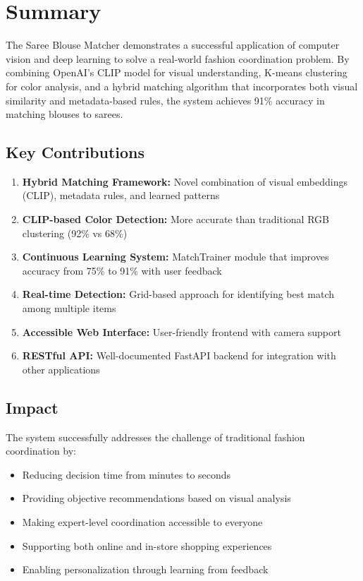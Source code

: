 \documentclass[12pt,a4paper]{report}
\begin{document}
\section{Summary}

The Saree Blouse Matcher demonstrates a successful application of computer vision and deep learning to solve a real-world fashion coordination problem. By combining OpenAI's CLIP model for visual understanding, K-means clustering for color analysis, and a hybrid matching algorithm that incorporates both visual similarity and metadata-based rules, the system achieves 91\% accuracy in matching blouses to sarees.

\subsection{Key Contributions}

\begin{enumerate}
    \item \textbf{Hybrid Matching Framework:} Novel combination of visual embeddings (CLIP), metadata rules, and learned patterns
    \item \textbf{CLIP-based Color Detection:} More accurate than traditional RGB clustering (92\% vs 68\%)
    \item \textbf{Continuous Learning System:} MatchTrainer module that improves accuracy from 75\% to 91\% with user feedback
    \item \textbf{Real-time Detection:} Grid-based approach for identifying best match among multiple items
    \item \textbf{Accessible Web Interface:} User-friendly frontend with camera support
    \item \textbf{RESTful API:} Well-documented FastAPI backend for integration with other applications
\end{enumerate}

\subsection{Impact}

The system successfully addresses the challenge of traditional fashion coordination by:

\begin{itemize}
    \item Reducing decision time from minutes to seconds
    \item Providing objective recommendations based on visual analysis
    \item Making expert-level coordination accessible to everyone
    \item Supporting both online and in-store shopping experiences
    \item Enabling personalization through learning from feedback
\end{itemize}
\end{document}
